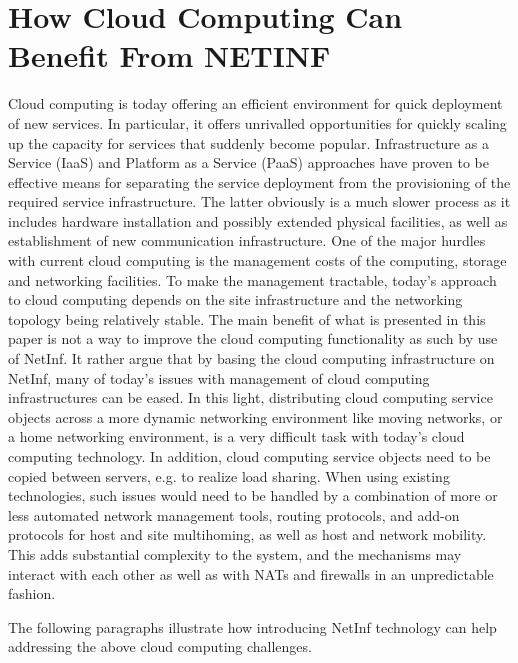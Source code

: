 \chapter{How Cloud Computing Can Benefit From NETINF}
Cloud computing is today offering an efficient
environment for quick deployment of new services. In
particular, it offers unrivalled opportunities for quickly
scaling up the capacity for services that suddenly become
popular. Infrastructure as a Service (IaaS) and Platform as a
Service (PaaS) approaches have proven to be effective
means for separating the service deployment from the
provisioning of the required service infrastructure. The latter
obviously is a much slower process as it includes hardware
installation and possibly extended physical facilities, as well
as establishment of new communication infrastructure. One
of the major hurdles with current cloud computing is the
management costs of the computing, storage and networking
facilities. To make the management tractable, today’s
approach to cloud computing depends on the site
infrastructure and the networking topology being relatively
stable.
The main benefit of what is presented in this paper is not
a way to improve the cloud computing functionality as such
by use of NetInf. It rather argue that by basing the cloud
computing infrastructure on NetInf, many of today’s issues
with management of cloud computing infrastructures can be
eased.
In this light, distributing cloud computing service objects
across a more dynamic networking environment like moving
networks, or a home networking environment, is a very
difficult task with today’s cloud computing technology. In
addition, cloud computing service objects need to be copied
between servers, e.g. to realize load sharing. When using
existing technologies, such issues would need to be handled
by a combination of more or less automated network
management tools, routing protocols, and add-on protocols
for host and site multihoming, as well as host and network
mobility. This adds substantial complexity to the system, and
the mechanisms may interact with each other as well as with
NATs and firewalls in an unpredictable fashion.

The following paragraphs illustrate how introducing
NetInf technology can help addressing the above cloud
computing challenges.

